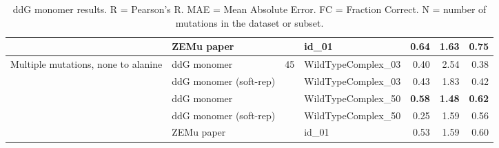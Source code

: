 \begin{table}
\begin{tabular}{llrlrrr}
 & ZEMu paper & & id\_01 & \textbf{0.64} & 1.63 & 0.75  \\
\hline
 \multirow{ 5}{*}{Multiple mutations, none to alanine} & ddG monomer & \multirow{ 5}{*}{45} & WildTypeComplex\_03 & 0.40 & 2.54 & 0.38  \\
 & ddG monomer (soft-rep) & & WildTypeComplex\_03 & 0.43 & 1.83 & 0.42  \\
 & ddG monomer & & WildTypeComplex\_50 & \textbf{0.58} & \textbf{1.48} & \textbf{0.62}  \\
 & ddG monomer (soft-rep) & & WildTypeComplex\_50 & 0.25 & 1.59 & 0.56  \\
 & ZEMu paper & & id\_01 & 0.53 & 1.59 & 0.60  \\
\bottomrule
\end{tabular}
  \caption[ddG monomer results]{
    ddG monomer results. R = Pearson's R. MAE = Mean Absolute Error. FC = Fraction Correct. N = number of mutations in the dataset or subset.
  } \label{tab:table-ddG-monomer}
\end{table}
